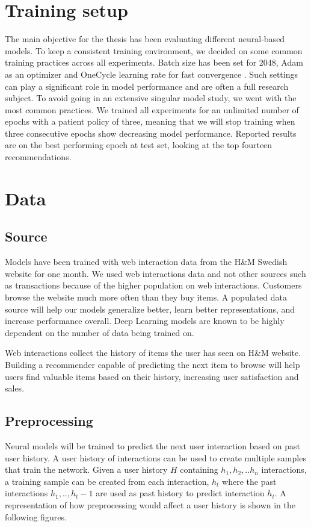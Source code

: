 \documentclass{tex_files/kththesis}
\begin{document}
\section{Training setup}
The main objective for the thesis has been evaluating different neural-based models. To keep a consistent training environment, we decided on some common training practices across all experiments. Batch size has been set for 2048, Adam \cite{adam} as an optimizer and OneCycle learning rate for fast convergence \cite{onecycle}. Such settings can play a significant role in model performance and are often a full research subject. To avoid going in an extensive singular model study, we went with the most common practices. We trained all experiments for an unlimited number of epochs with a patient policy of three, meaning that we will stop training when three consecutive epochs show decreasing model performance. Reported results are on the best performing epoch at test set, looking at the top fourteen recommendations.

\section{Data}
\subsection{Source}
Models have been trained with web interaction data from the H\&M Swedish website for one month. We used web interactions data and not other sources such as transactions because of the higher population on web interactions. Customers browse the website much more often than they buy items. A populated data source will help our models generalize better, learn better representations, and increase performance overall. Deep Learning models are known to be highly dependent on the number of data being trained on.

Web interactions collect the history of items the user has seen on H\&M website. Building a recommender capable of predicting the next item to browse will help users find valuable items based on their history, increasing user satisfaction and sales.

\subsection{Preprocessing}
Neural models will be trained to predict the next user interaction based on past user history. A user history of interactions can be used to create multiple samples that train the network. Given a user history $H$ containing $h_1, h_2, .. h_n$ interactions, a training sample can be created from each interaction, $h_t$ where the past interactions $h_1, .., h_t-1$ are used as past history to predict interaction $h_t$. A representation of how preprocessing would affect a user history is shown in the following figures.
\end{document}
